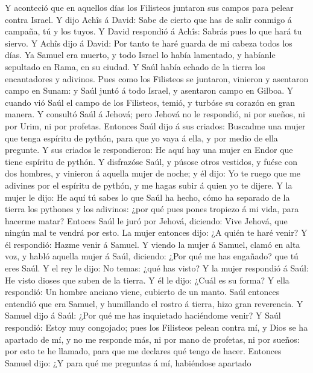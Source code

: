  Y aconteció que en aquellos días los Filisteos juntaron
sus campos para pelear contra Israel. Y dijo Achîs á David: Sabe de
cierto que has de salir conmigo á campaña, tú y los tuyos.
 Y David respondió á Achîs: Sabrás pues lo que hará tu
siervo. Y Achîs dijo á David: Por tanto te haré guarda de mi cabeza
todos los días.  Ya Samuel era muerto, y todo Israel lo
había lamentado, y habíanle sepultado en Rama, en su ciudad. Y Saúl
había echado de la tierra los encantadores y adivinos. 
Pues como los Filisteos se juntaron, vinieron y asentaron campo en
Sunam: y Saúl juntó á todo Israel, y asentaron campo en Gilboa.
 Y cuando vió Saúl el campo de los Filisteos, temió, y
turbóse su corazón en gran manera.  Y consultó Saúl á
Jehová; pero Jehová no le respondió, ni por sueños, ni por Urim, ni por
profetas.  Entonces Saúl dijo á sus criados: Buscadme una
mujer que tenga espíritu de pythón, para que yo vaya á ella, y por medio
de ella pregunte. Y sus criados le respondieron: He aquí hay una mujer
en Endor que tiene espíritu de pythón.  Y disfrazóse Saúl,
y púsose otros vestidos, y fuése con dos hombres, y vinieron á aquella
mujer de noche; y él dijo: Yo te ruego que me adivines por el espíritu
de pythón, y me hagas subir á quien yo te dijere.  Y la
mujer le dijo: He aquí tú sabes lo que Saúl ha hecho, cómo ha separado
de la tierra los pythones y los adivinos: ¿por qué pues pones tropiezo á
mi vida, para hacerme matar?  Entoces Saúl le juró por
Jehová, diciendo: Vive Jehová, que ningún mal te vendrá por esto.
 La mujer entonces dijo: ¿A quién te haré venir? Y él
respondió: Hazme venir á Samuel.  Y viendo la mujer á
Samuel, clamó en alta voz, y habló aquella mujer á Saúl, diciendo:
 ¿Por qué me has engañado? que tú eres Saúl. Y el rey le
dijo: No temas: ¿qué has visto? Y la mujer respondió á Saúl: He visto
dioses que suben de la tierra.  Y él le dijo: ¿Cuál es su
forma? Y ella respondió: Un hombre anciano viene, cubierto de un manto.
Saúl entonces entendió que era Samuel, y humillando el rostro á tierra,
hizo gran reverencia.  Y Samuel dijo á Saúl: ¿Por qué me
has inquietado haciéndome venir? Y Saúl respondió: Estoy muy congojado;
pues los Filisteos pelean contra mí, y Dios se ha apartado de mí, y no
me responde más, ni por mano de profetas, ni por sueños: por esto te he
llamado, para que me declares qué tengo de hacer. 
Entonces Samuel dijo: ¿Y para qué me preguntas á mí, habiéndose apartado
